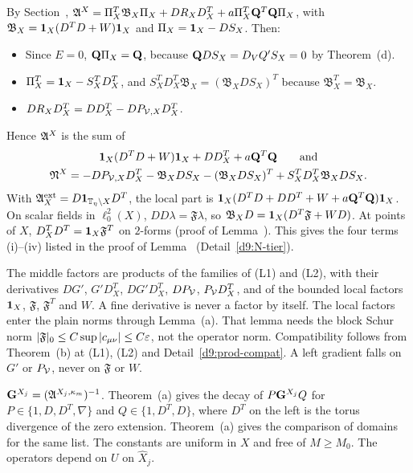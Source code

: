 \begin{detail}\label{d9:L3}
\begin{step}
By Section~, $\mathfrak A^X=\Pi_X^T\mathfrak B_X\Pi_X+DR_XD^T_X+a\Pi_X^T\mathbf Q^T\mathbf Q\Pi_X$, with $\mathfrak B_X=\mathbf 1_X(D^TD+W)\mathbf 1_X$ and $\Pi_X=\mathbf 1_X-DS_X$. Then:
\begin{itemize}
\item Since $E=0$, $\mathbf Q\Pi_X=\mathbf Q$, because $\mathbf Q DS_X=D_VQ'S_X=0$ by Theorem~(d).
\item $\Pi_X^T=\mathbf 1_X-S_X^TD^T_X$, and $S_X^TD^T_X\mathfrak B_X=(\mathfrak B_XDS_X)^T$ because $\mathfrak B_X^T=\mathfrak B_X$.
\item $DR_XD^T_X=DD^T_X-DP_{\mathcal V,X}D^T_X$.
\end{itemize}
Hence $\mathfrak A^X$ is the sum of
\begin{gather*}
\mathbf 1_X(D^TD+W)\mathbf 1_X+DD^T_X+a\mathbf Q^T\mathbf Q\qquad\text{and}\\
\mathfrak N^X=-DP_{\mathcal V,X}D^T_X-\mathfrak B_XDS_X-(\mathfrak B_XDS_X)^T+S_X^TD^T_X\mathfrak B_XDS_X .
\end{gather*}
With $\mathfrak A^{\rm ext}_X=D\mathbf 1_{\mathbb T_\eta\setminus X}D^T$, the local part is $\mathbf 1_X(D^TD+DD^T+W+a\mathbf Q^T\mathbf Q)\mathbf 1_X$. On scalar fields in $\ell^2_0(X)$, $DD\lambda=\mathfrak F\lambda$, so $\mathfrak B_XD=\mathbf 1_X(D^T\mathfrak F+WD)$. At points of $X$, $D^T_XD^T=\mathbf 1_X\mathfrak F^T$ on $2$-forms (proof of Lemma~). This gives the four terms (i)--(iv) listed in the proof of Lemma~ (Detail~\ref{d9:N-tier}).
\end{step}
\begin{step}[(W3)]
The middle factors are products of the families of (L1) and (L2), with their derivatives $DG'$, $G'D^T_X$, $DG'D^T_X$, $DP_\mathcal V$, $P_\mathcal V D^T_X$, and of the bounded local factors $\mathbf 1_X$, $\mathfrak F$, $\mathfrak F^T$ and $W$. A fine derivative is never a factor by itself. The local factors enter the plain norms through Lemma~(a). That lemma needs the block Schur norm $|\mathfrak F|_0\le C\sup|c_{\mu\nu}|\le C\varepsilon$, not the operator norm. Compatibility follows from Theorem~(b) at (L1), (L2) and Detail~\ref{d9:prod-compat}. A left gradient falls on $G'$ or $P_\mathcal V$, never on $\mathfrak F$ or $W$.
\end{step}
\begin{step}[(W2)]
$\mathbf G^{X_j}=(\mathfrak A^{X_j,\kappa_m})^{-1}$. Theorem~(a) gives the decay of $P\mathbf G^{X_j}Q$ for $P\in\{1,D,D^T,\nabla\}$ and $Q\in\{1,D^T,D\}$, where $D^T$ on the left is the torus divergence of the zero extension. Theorem~(a) gives the comparison of domains for the same list. The constants are uniform in $X$ and free of $M\ge M_0$. The operators depend on $U$ on $\hat X_j$.

\end{step}
\end{detail}
